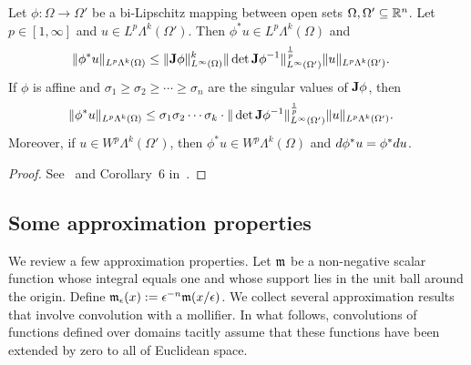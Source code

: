 \documentclass[10pt,a4paper]{article}
\begin{document}
\begin{proposition}\label{proposition:pullbackestimate}
    Let $\phi : \Omega \rightarrow \Omega'$ be a bi-Lipschitz mapping between open sets $\Omega, \Omega' \subseteq {\mathbb R}^{n}$.
    Let $p \in [1,\infty]$ and $u \in L^{p}\Lambda^{k}(\Omega')$. 
    Then $\phi^{\ast} u \in L^{p}\Lambda^{k}(\Omega)$ and 
    \begin{align}
        \| \phi^{\ast} u \|_{L^{p}\Lambda^{k}(\Omega)}
        &\leq 
        \| {\mathbf{J}} \phi \|^{k}_{L^{\infty}(\Omega)}
        \| \det{\mathbf{J}} \phi^{-1} \|^{\frac{1}{p}}_{L^{\infty}(\Omega')}
        \| u \|_{L^{p}\Lambda^{k}(\Omega')}
        .
    \end{align}
    If $\phi$ is affine and $\sigma_1 \geq \sigma_2 \geq \cdots \geq \sigma_n$ are the singular values of ${\mathbf{J}}\phi$, then 
    \begin{align}
        \| \phi^{\ast} u \|_{L^{p}\Lambda^{k}(\Omega)}
        &\leq 
        \sigma_1 \sigma_2 \cdots \sigma_k \cdot 
        \| \det{\mathbf{J}} \phi^{-1} \|^{\frac{1}{p}}_{L^{\infty}(\Omega')}
        \| u \|_{L^{p}\Lambda^{k}(\Omega')}
        .
    \end{align}
    Moreover, if $u \in W^{p}\Lambda^{k}(\Omega')$, then $\phi^{\ast} u \in W^{p}\Lambda^{k}(\Omega)$ and $d \phi^{\ast} u = \phi^{\ast} d u$. 
\end{proposition}
\begin{proof}
    See~\cite{licht2019smoothed} and Corollary~6 in~\cite{stern2013lp}.
\end{proof}




\subsection{Some approximation properties}

We review a few approximation properties. 
Let ${\mathfrak m}$ be a non-negative scalar function whose integral equals one and whose support lies in the unit ball around the origin.
Define ${\mathfrak m}_{\epsilon}(x) := \epsilon^{-n} {\mathfrak m}(x/\epsilon)$. We collect several approximation results that involve convolution with a mollifier.
In what follows, convolutions of functions defined over domains tacitly assume that these functions have been extended by zero to all of Euclidean space. 

\end{document}
